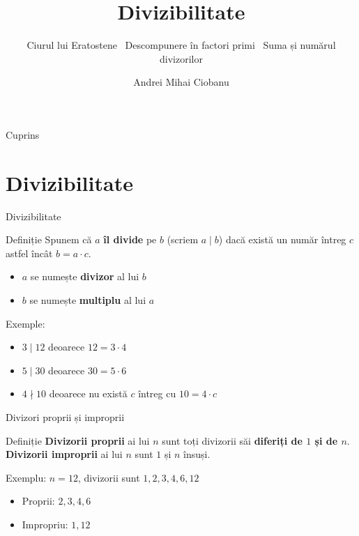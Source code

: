 ﻿\documentclass{beamer}
\title{Divizibilitate}
\subtitle{Ciurul lui Eratostene \textbar\ Descompunere în factori primi \textbar\ Suma și numărul divizorilor}
\author{Andrei Mihai Ciobanu}
\institute{Algolymp Summer School}
\date{}
\begin{document}
\begin{frame}
  \titlepage
\end{frame}

\begin{frame}{Cuprins}
  \tableofcontents
\end{frame}

\section{Divizibilitate}

\begin{frame}{Divizibilitate}
  \begin{block}{Definiție}
    Spunem că $a$ \textbf{îl divide} pe $b$ (scriem $a \mid b$) dacă există un număr întreg $c$
    astfel încât $b = a \cdot c$.
  \end{block}
  \bigskip
  \begin{itemize}
    \item $a$ se numește \textbf{divizor} al lui $b$
    \item $b$ se numește \textbf{multiplu} al lui $a$
  \end{itemize}
  \bigskip
  Exemple:
  \begin{itemize}
    \item $3 \mid 12$ deoarece $12 = 3 \cdot 4$
    \item $5 \mid 30$ deoarece $30 = 5 \cdot 6$
    \item $4 \nmid 10$ deoarece nu există $c$ întreg cu $10 = 4 \cdot c$
  \end{itemize}
\end{frame}

\begin{frame}{Divizori proprii și improprii}
  \begin{block}{Definiție}
    \textbf{Divizorii proprii} ai lui $n$ sunt toți divizorii săi \textbf{diferiți de $1$ și de $n$}. \\
    \textbf{Divizorii improprii} ai lui $n$ sunt $1$ și $n$ însuși.
  \end{block}
  \bigskip
  Exemplu: $n = 12$, divizorii sunt $1, 2, 3, 4, 6, 12$
  \begin{itemize}
    \item Proprii: $2, 3, 4, 6$
    \item Impropriu: $1, 12$
  \end{itemize}
\end{frame}
\end{document}
